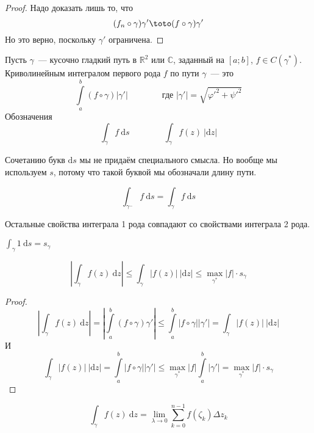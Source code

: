 \documentclass{article}
\begin{document}
    \begin{proof}
        Надо доказать лишь то, что
        $$
        (f_n\circ\gamma)\gamma'\toto(f\circ\gamma)\gamma'
        $$
        Но это верно, поскольку $\gamma'$ ограничена.
    \end{proof}
    \begin{definition}
        Пусть $\gamma$~--- кусочно гладкий путь в $\mathbb R^2$ или $\mathbb C$, заданный на $[a;b]$, $f\in C(\gamma^*)$. Криволинейным интегралом первого рода $f$ по пути $\gamma$~--- это
        $$
        \int\limits_a^b(f\circ\gamma)|\gamma'|\qquad\qquad \text{где }|\gamma'|=\sqrt{{\varphi'}^2+{\psi'}^2}
        $$
        Обозначения
        $$
        \int_\gamma f~\mathrm ds\qquad\qquad\int_\gamma f(z)~|\mathrm dz|
        $$
    \end{definition}
    \begin{remark}
        Сочетанию букв $\mathrm ds$ мы не придаём специального смысла. Но вообще мы используем $s$, потому что такой буквой мы обозначали длину пути.
    \end{remark}
    \begin{property}
        $$
        \int_{\gamma^-}f~\mathrm ds=\int_\gamma f~\mathrm ds
        $$
    \end{property}
    \begin{property}
        Остальные свойства интеграла 1 рода совпадают со свойствами интеграла 2 рода.
    \end{property}
    \begin{property}
        $\int_\gamma1~\mathrm ds=s_\gamma$
    \end{property}
    \begin{property}
        \label{Оценка криволинейного интеграла}
        $$
        \left|\int_\gamma f(z)~\mathrm dz\right|\leqslant\int_\gamma |f(z)|~|\mathrm dz|\leqslant \max\limits_{\gamma^*}|f|\cdot s_\gamma
        $$
    \end{property}
    \begin{proof}
        $$
        \left|\int_\gamma f(z)~\mathrm dz\right|=\left|\int\limits_a^b(f\circ\gamma)\gamma'\right|\leqslant\int\limits_a^b|f\circ\gamma||\gamma'|=\int_\gamma|f(z)|~|\mathrm dz|
        $$
        И
        $$
        \int_\gamma|f(z)|~|\mathrm dz|=\int\limits_a^b|f\circ\gamma||\gamma'|\leqslant\max\limits_{\gamma^*}|f|\int\limits_a^b|\gamma'|=\max\limits_{\gamma^*}|f|\cdot s_\gamma
        $$
    \end{proof}
    \begin{property}
        $$
        \int_\gamma f(z)~\mathrm dz=\lim\limits_{\lambda\to0}\sum\limits_{k=0}^{n-1}f(\zeta_k)\Delta z_k
        $$
    \end{property}
\end{document}
